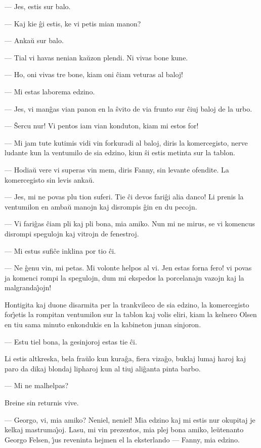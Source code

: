  --- Jes, estis sur balo.

 --- Kaj kie \^gi estis, ke vi petis mian manon?

 --- Anka\u u sur balo.

 --- Tial vi havas nenian ka\u uzon plendi. Ni vivas bone kune.

 --- Ho, oni vivas tre bone, kiam oni \^ciam veturas al baloj!

 --- Mi estas laborema edzino.

 --- Jes, vi man\^gas vian panon en la \^svito de via frunto sur \^ciuj
baloj de la urbo.

 --- \^Sercu nur! Vi pentos iam vian konduton, kiam mi estos for!

 --- Mi jam tute kutimis vidi vin forkuradi al baloj, diris la
komercegisto, nerve ludante kun la ventumilo de sia edzino, kiun
\^si estis metinta sur la tablon.

 --- Hodia\u u vere vi superas vin mem, diris Fanny, sin levante
ofendite. La komercegisto sin levis anka\u u.

 --- Jes, mi ne povas plu tion suferi. Tie \^ci devos fari\^gi alia
danco! Li prenis la ventumilon en amba\u u manojn kaj disrompis
\^gin en du pecojn.

 --- Vi fari\^gas \^ciam pli kaj pli bona, mia amiko. Nun mi ne mirus, se
vi komencus disrompi spegulojn kaj vitrojn de fenestroj.

 --- Mi estus sufi\^ce inklina por tio \^ci.

 --- Ne \^genu vin, mi petas. Mi volonte helpos al vi. Jen estas forna
fero! vi povas ja komenci rompi la spegulojn, dum mi ekspedos la
porcelanajn vazojn kaj la malgranda\^{\j}ojn!

   Hontigita kaj duone disarmita per la trankvileco de sia edzino,
la ko\-mer\-ce\-gis\-to for\^{\j}etis la rompitan ventumilon sur la
tablon kaj volis eliri, kiam la kelnero Olsen en tiu sama minuto
enkondukis en la kabineton junan sinjoron.

 --- Estu tiel bona, la gesinjoroj estas tie \^ci.

   Li estis altkreska, bela fra\u ulo kun kura\^ga, fiera viza\^go, buklaj
lumaj haroj kaj paro da dikaj blondaj lipharoj kun al tiuj
ali\^ganta pinta barbo.

 --- Mi ne malhelpas?

   Breine sin returnis vive.

 --- Georgo, vi, mia amiko? Neniel, neniel! Mia edzino kaj mi estis
nur okupitaj je kelkaj mastruma\^{\j}oj. Lasu, mi vin prezentos, mia
plej bona amiko, le\u utenanto Georgo Felsen, \^{\j}us reveninta
hejmen el la eksterlando --- Fanny, mia edzino.

